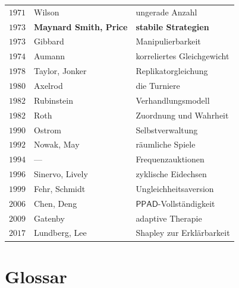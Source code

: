\begin{merksatz}
\begin{center}
{\begin{tabular}{@{}P{1.4cm}P{2.8cm}P{4.0cm}@{}}
$1971$ & Wilson & ungerade Anzahl\\
$1973$ & \textbf{Maynard Smith, Price} & \textbf{stabile Strategien}\\
$1973$ & Gibbard & Manipulierbarkeit\\
$1974$ & Aumann & korreliertes Gleichgewicht\\
$1978$ & Taylor, Jonker & Replikatorgleichung\\
$1980$ & Axelrod & die Turniere\\
$1982$ & Rubinstein & Verhandlungsmodell\\
$1982$ & Roth & Zuordnung und Wahrheit\\
$1990$ & Ostrom & Selbstverwaltung\\
$1992$ & Nowak, May & räumliche Spiele\\
$1994$ & --- & Frequenzauktionen\\
$1996$ & Sinervo, Lively & zyklische Eidechsen\\
$1999$ & Fehr, Schmidt & Ungleichheitsaversion\\
$2006$ & Chen, Deng & $\mathsf{PPAD}$-Vollständigkeit\\
$2009$ & Gatenby & adaptive Therapie\\
$2017$ & Lundberg, Lee & Shapley zur Erklärbarkeit\\
\bottomrule
\end{tabular}}
\end{center}
\end{merksatz}

\section{Glossar}

